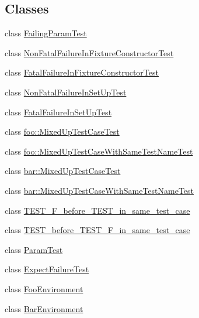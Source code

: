 \subsection*{Classes}
\begin{DoxyCompactItemize}
\item 
class \mbox{\hyperlink{class_failing_param_test}{Failing\+Param\+Test}}
\item 
class \mbox{\hyperlink{class_non_fatal_failure_in_fixture_constructor_test}{Non\+Fatal\+Failure\+In\+Fixture\+Constructor\+Test}}
\item 
class \mbox{\hyperlink{class_fatal_failure_in_fixture_constructor_test}{Fatal\+Failure\+In\+Fixture\+Constructor\+Test}}
\item 
class \mbox{\hyperlink{class_non_fatal_failure_in_set_up_test}{Non\+Fatal\+Failure\+In\+Set\+Up\+Test}}
\item 
class \mbox{\hyperlink{class_fatal_failure_in_set_up_test}{Fatal\+Failure\+In\+Set\+Up\+Test}}
\item 
class \mbox{\hyperlink{classfoo_1_1_mixed_up_test_case_test}{foo\+::\+Mixed\+Up\+Test\+Case\+Test}}
\item 
class \mbox{\hyperlink{classfoo_1_1_mixed_up_test_case_with_same_test_name_test}{foo\+::\+Mixed\+Up\+Test\+Case\+With\+Same\+Test\+Name\+Test}}
\item 
class \mbox{\hyperlink{classbar_1_1_mixed_up_test_case_test}{bar\+::\+Mixed\+Up\+Test\+Case\+Test}}
\item 
class \mbox{\hyperlink{classbar_1_1_mixed_up_test_case_with_same_test_name_test}{bar\+::\+Mixed\+Up\+Test\+Case\+With\+Same\+Test\+Name\+Test}}
\item 
class \mbox{\hyperlink{class_t_e_s_t___f__before___t_e_s_t__in__same__test__case}{T\+E\+S\+T\+\_\+\+F\+\_\+before\+\_\+\+T\+E\+S\+T\+\_\+in\+\_\+same\+\_\+test\+\_\+case}}
\item 
class \mbox{\hyperlink{class_t_e_s_t__before___t_e_s_t___f__in__same__test__case}{T\+E\+S\+T\+\_\+before\+\_\+\+T\+E\+S\+T\+\_\+\+F\+\_\+in\+\_\+same\+\_\+test\+\_\+case}}
\item 
class \mbox{\hyperlink{class_param_test}{Param\+Test}}
\item 
class \mbox{\hyperlink{class_expect_failure_test}{Expect\+Failure\+Test}}
\item 
class \mbox{\hyperlink{class_foo_environment}{Foo\+Environment}}
\item 
class \mbox{\hyperlink{class_bar_environment}{Bar\+Environment}}
\end{DoxyCompactItemize}
